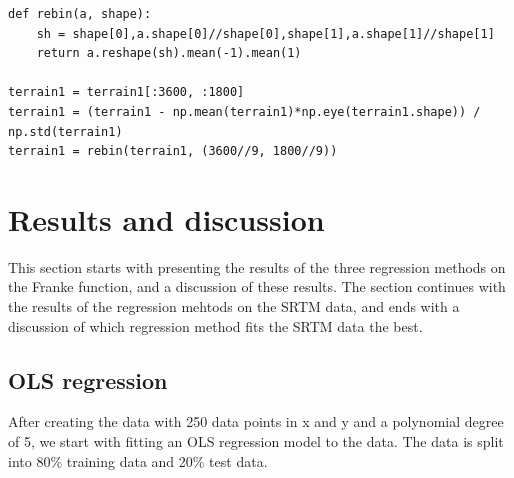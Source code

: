 \documentclass[12pt]{extarticle}
\begin{document}
\begin{lstlisting}
def rebin(a, shape):
    sh = shape[0],a.shape[0]//shape[0],shape[1],a.shape[1]//shape[1]
    return a.reshape(sh).mean(-1).mean(1)
    
terrain1 = terrain1[:3600, :1800]
terrain1 = (terrain1 - np.mean(terrain1)*np.eye(terrain1.shape)) / np.std(terrain1)
terrain1 = rebin(terrain1, (3600//9, 1800//9))
\end{lstlisting}


\section{Results and discussion}

This section starts with presenting the results of the three regression methods on the Franke function, and a discussion of these results. The section continues with the results of the regression mehtods on the SRTM data, and ends with a discussion of which regression method fits the SRTM data the best.

\subsection{OLS regression}

After creating the data with 250 data points in x and y and a polynomial degree of 5, we start with fitting an OLS regression model to the data. The data is split into 80\% training data and 20\% test data.

\end{document}
